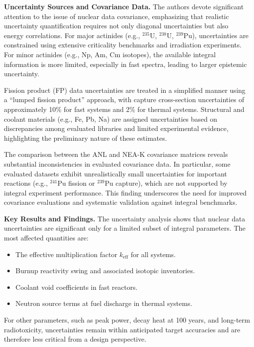 \textbf{Uncertainty Sources and Covariance Data.}  
The authors devote significant attention to the issue of nuclear data covariance, emphasizing that realistic 
uncertainty quantification requires not only diagonal uncertainties but also energy correlations. For major 
actinides (e.g., $^{235}$U, $^{238}$U, $^{239}$Pu), uncertainties are constrained using extensive criticality benchmarks 
and irradiation experiments. For minor actinides (e.g., Np, Am, Cm isotopes), the available integral information is more limited, 
especially in fast spectra, leading to larger epistemic uncertainty.

Fission product (FP) data uncertainties are treated in a simplified manner using a ``lumped fission product'' approach, with 
capture cross-section uncertainties of approximately 10\% for fast systems and 2\% for thermal systems. Structural and coolant 
materials (e.g., Fe, Pb, Na) are assigned uncertainties based on discrepancies among evaluated libraries and limited experimental 
evidence, highlighting the preliminary nature of these estimates.

The comparison between the ANL and NEA-K covariance matrices reveals substantial inconsistencies in evaluated covariance data. 
In particular, some evaluated datasets exhibit unrealistically small uncertainties for important reactions (e.g., $^{241}$Pu 
fission or $^{239}$Pu capture), which are not supported by integral experiment performance. This finding underscores the need for 
improved covariance evaluations and systematic validation against integral benchmarks.

\textbf{Key Results and Findings.}  
The uncertainty analysis shows that nuclear data uncertainties are significant only for a limited subset of integral parameters. 
The most affected quantities are:
\begin{itemize}
    \item The effective multiplication factor $k_{\text{eff}}$ for all systems.
    \item Burnup reactivity swing and associated isotopic inventories.
    \item Coolant void coefficients in fast reactors.
    \item Neutron source terms at fuel discharge in thermal systems.
\end{itemize}

For other parameters, such as peak power, decay heat at 100 years, and long-term radiotoxicity, uncertainties remain 
within anticipated target accuracies and are therefore less critical from a design perspective.

